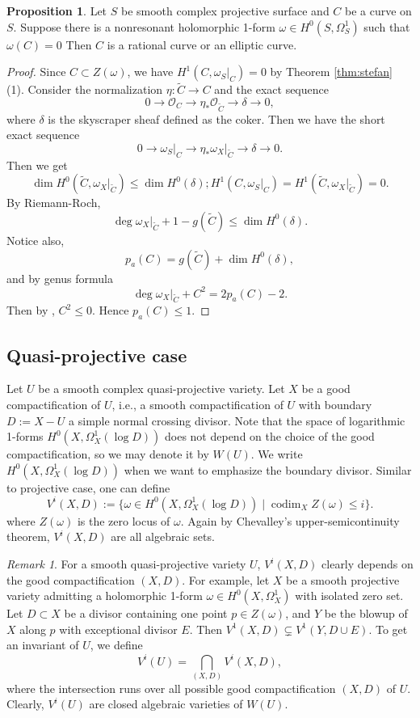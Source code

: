 \documentclass[a4paper,12pt,reqno]{amsart}
\theoremstyle{plain}
\theoremstyle{definition}
\newtheorem{proposition}[theorem]{Proposition}
\theoremstyle{remark}
\newtheorem{remark}[theorem]{Remark}
\newcommand{\codim}{\operatorname{codim}}
\begin{document}
 \begin{proposition}
 Let $S$ be smooth complex projective surface and $C$ be a curve on $S$. Suppose there is a nonresonant holomorphic 1-form $\omega\in H^0(S, \Omega_S^1)$ such that $\omega(C)=0$ Then $C$ is a rational curve or an elliptic curve.
 \end{proposition}
 
 
 \begin{proof}
 Since $C\subset Z(\omega)$, we have $H^1(C, {\omega_S}|_C)=0$ by Theorem \ref{thm:stefan} (1). Consider the normalization $\eta: \widetilde{C}\to C$ and the exact sequence $$0\to \mathcal{O}_C\to \eta_*\mathcal{O}_{\widetilde{C}}\to \delta\to 0, $$ where $\delta$ is the skyscraper sheaf defined as the coker. Then we have the short exact sequence $$0\to {\omega_S}|_C\to \eta_*{{\omega_X}|_{\widetilde{C}}}\to \delta\to 0.$$ Then we get $$\dim H^0(\widetilde{C}, {\omega_X}|_{\widetilde{C}})\leq \dim H^0(\delta);   H^1(C, {\omega_S}|_C)=H^1(\widetilde{C}, {\omega_X}|_{\widetilde{C}})=0.$$ By Riemann-Roch, $$\deg {\omega_X}|_{\widetilde{C}}+1-g(\widetilde{C})\leq \dim H^0(\delta).$$ Notice also, $$p_a(C)=g(\widetilde{C})+\dim H^0(\delta), $$ and by genus formula $$\deg {\omega_X}|_{\widetilde{C}}+C^2=2p_a(C)-2.$$ Then by \cite[Theorem 1]{Sp88}, $C^2\leq 0$. Hence $p_a(C)\leq1$.
 \end{proof}
 

 \subsection{Quasi-projective case}
 

Let $U$ be a smooth complex quasi-projective variety. Let $X$ be a good compactification of $U$, i.e., a smooth compactification of $U$ with boundary $D:=X-U$ a simple normal crossing divisor. Note that the space of logarithmic 1-forms $H^0(X, \Omega_X^1(\log D))$ does not depend on the choice of the good compactification, so we may denote it by $W(U)$. We write $H^0(X, \Omega_X^1(\log D))$ when we want to emphasize the boundary divisor. Similar to projective case,  one can define $$V^i(X,D):=\{ \omega\in H^0(X, \Omega_X^1(\log D)) \mid \codim_X Z(\omega) \leq i \}.$$
where $Z(\omega)$ is the zero locus of $\omega$. Again by Chevalley's upper-semicontinuity theorem, $V^i(X, D)$ are all algebraic sets.

\begin{remark} For a smooth quasi-projective variety $U$, $V^i(X,D)$ clearly depends on the good compactification $(X,D)$. For example, let $X$ be a smooth projective variety admitting a holomorphic 1-form $\omega\in H^0(X, \Omega_X^1)$ with isolated zero set. Let $D\subset X$ be a divisor containing one point $p \in Z(\omega)$, and $Y$ be the blowup of $X$ along $p$ with exceptional divisor $E$. Then $V^1(X, D)\subsetneq V^1(Y, D\cup E)$. To get an invariant of $U$, we define
$$V^i(U)= \bigcap_{(X,D)} V^i(X,D) ,$$
where the intersection runs over all possible good compactification $(X,D)$ of $U$. Clearly, $V^i(U) $ are closed algebraic varieties of $W(U)$.
\end{remark} 
\end{document}
